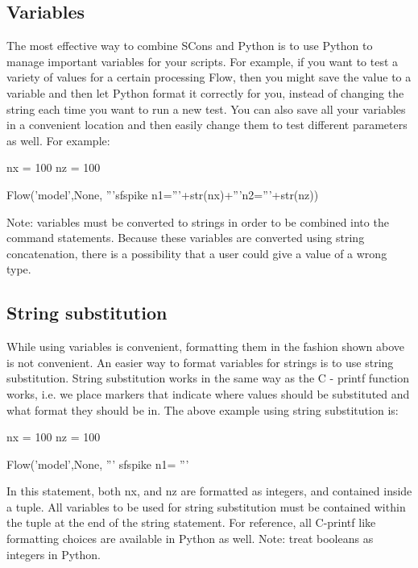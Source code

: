 \subsection{Variables}

The most effective way to combine SCons and Python is to use Python to manage important variables for your scripts.  For example, if you want to test a variety of values for a certain processing Flow, then you might save the value to a variable and then let Python format it correctly for you, instead of changing the string each time you want to run a new test.  You can also save all your variables in a convenient location and then easily change them to test different parameters as well.  For example:

\begin{verbatimtab}[4]
nx = 100
nz = 100

Flow('model',None,
	'''sfspike n1='''+str(nx)+'''n2='''+str(nz))
\end{verbatimtab}
Note: variables must be converted to strings in order to be combined into the command statements.  Because these variables are converted using string concatenation, there is a possibility that a user could give a value of a wrong type.  

\subsection{String substitution}

While using variables is convenient, formatting them in the fashion shown above is not convenient.  An easier way to format variables for strings is to use string substitution.   String substitution works in the same way as the C - printf function works, i.e. we place markers that indicate where values should be substituted and what format they should be in.  The above example using string substitution is:

\begin{verbatimtab}[4]
nx = 100
nz = 100

Flow('model',None,
	'''
	sfspike n1=%
	''' %
\end{verbatimtab}

In this statement, both nx, and nz are formatted as integers, and contained inside a tuple.  All variables to be used for string substitution must be contained within the tuple at the end of the string statement.  For reference, all C-printf like formatting choices are available in Python as well.  Note: treat booleans as integers in Python.

